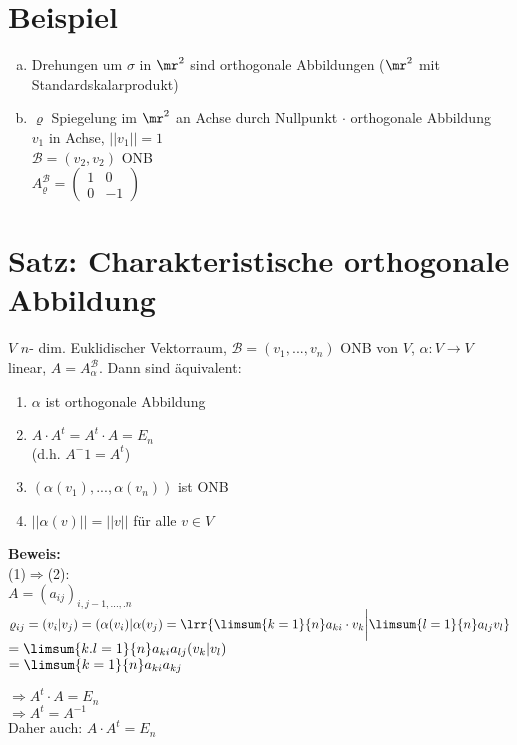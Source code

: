 \section{Beispiel}
	\begin{enumerate}[a)]
		\item  Drehungen um $ \sigma $ in $ \mr^2 $ sind orthogonale Abbildungen ($ \mr^2 $ mit Standardskalarprodukt)
		\item  $ \varrho $ Spiegelung im $ \mr^2 $ an Achse durch Nullpunkt $ \cdot $ orthogonale Abbildung\\
		$ v_1 $ in Achse, $||v_1||=1$\\
		$ \mathcal{B}=(v_2,v_2) $ ONB\\
		$ A_\varrho^{\mathcal{B}}=\begin{pmatrix}
		1&0\\
		0&-1
		\end{pmatrix}$
	\end{enumerate}
	
\section{Satz: Charakteristische orthogonale Abbildung}
	$ V $ $ n $- dim. Euklidischer Vektorraum, $ \mathcal{B}=(v_1,...,v_n) $ ONB von $ V $, $ \alpha: V\rightarrow V $ linear, $ A=A_\alpha^{\mathcal{B}} $. Dann sind äquivalent:
	\begin{enumerate}[(1)]
		\item $ \alpha $ ist orthogonale Abbildung
		\item  $ A\cdot A^t=A^t\cdot A=E_n $\\
		(d.h. $ A^-1=A^t $)
		\item  $ (\alpha(v_1),...,\alpha(v_n)) $ ist ONB
		\item $ ||\alpha(v)||=||v|| $ für alle $ v\in V $
	\end{enumerate}
	
	\textbf{Beweis:}\\
	(1)$ \Rightarrow $(2):\\
	$ A=(a_{ij})_{i,j-1,...,.n} $\\
	$ \varrho_{ij}=(v_i|v_j)=(\alpha(v_i)|\alpha(v_j)=\lrr{\limsum{k=1}{n}a_{ki}\cdot v_k\bigg|\limsum{l=1}{n}a_{lj}v_l} $\\
	$ =\limsum{k.l=1}{n}a_{ki}a_{lj}(v_k|v_l) $\\
	$ =\limsum{k=1}{n}a_{ki}a_{kj} $
	
	$ \Rightarrow A^t\cdot A=E_n $\\
	$ \Rightarrow A^t=A^{-1} $\\
	Daher auch: $ A\cdot A^t=E_n $
	
